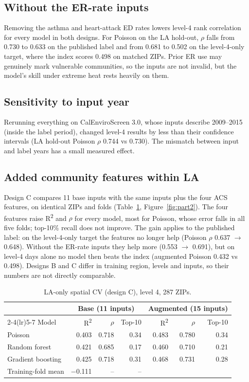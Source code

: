 \documentclass[10pt]{article}
\newcommand{\rhoS}{$\rho$}
\begin{document}
\subsection{Without the ER-rate inputs}
\label{sec:ablation}
Removing the asthma and heart-attack ED rates lowers level-4 rank correlation for every model in both designs. For Poisson on the LA hold-out, \rhoS{} falls from 0.730 to 0.633 on the published label and from 0.681 to 0.502 on the level-4-only target, where the index scores 0.498 on matched ZIPs. Prior ER use may genuinely mark vulnerable communities, so the inputs are not invalid, but the model's skill under extreme heat rests heavily on them.

\subsection{Sensitivity to input year}
Rerunning everything on CalEnviroScreen 3.0, whose inputs describe 2009--2015 (inside the label period), changed level-4 results by less than their confidence intervals (LA hold-out Poisson \rhoS{} 0.744 vs 0.730). The mismatch between input and label years has a small measured effect.

\subsection{Added community features within LA}
Design C compares 11 base inputs with the same inputs plus the four ACS features, on identical ZIPs and folds (Table~\ref{tab:part2}, Figure~\ref{fig:part2}). The four features raise R\textsuperscript{2} and \rhoS{} for every model, most for Poisson, whose error falls in all five folds; top-10\% recall does not improve. The gain applies to the published label: on the level-4-only target the features no longer help (Poisson \rhoS{} 0.637 $\to$ 0.648). Without the ER-rate inputs they help more (0.553 $\to$ 0.691), but on level-4 days alone no model then beats the index (augmented Poisson 0.432 vs 0.498). Designs B and C differ in training region, levels and inputs, so their numbers are not directly comparable.

\begin{table}[!htbp]
\centering\small
\caption{LA-only spatial CV (design C), level 4, 287 ZIPs.}
\label{tab:part2}
\begin{tabular}{@{}lrrrrrr@{}}
\toprule
& \multicolumn{3}{c}{Base (11 inputs)} & \multicolumn{3}{c}{Augmented (15 inputs)} \\
\cmidrule(lr){2-4}\cmidrule(lr){5-7}
Model & R\textsuperscript{2} & \rhoS{} & Top-10 & R\textsuperscript{2} & \rhoS{} & Top-10 \\
\midrule
Poisson & 0.403 & 0.718 & 0.34 & 0.483 & 0.780 & 0.34 \\
Random forest & 0.421 & 0.685 & 0.17 & 0.460 & 0.710 & 0.21 \\
Gradient boosting & 0.425 & 0.718 & 0.31 & 0.468 & 0.731 & 0.28 \\
Training-fold mean & $-$0.111 & -- & -- & & & \\
\bottomrule
\end{tabular}
\end{table}
\end{document}

